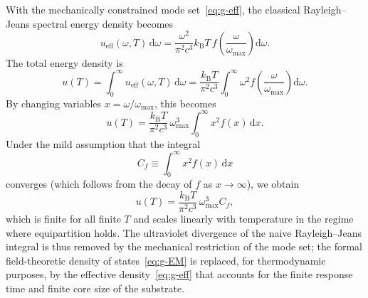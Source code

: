 \documentclass[11pt]{article}
\begin{document}
            With the mechanically constrained mode set~\eqref{eq:g-eff}, the classical
            Rayleigh--Jeans spectral energy density becomes
            \begin{equation}
                u_{\mathrm{eff}}(\omega,T)\,\mathrm{d}\omega
                = \frac{\omega^2}{\pi^2 c^3} k_{\mathrm B}T\,
                f\!\left(\frac{\omega}{\omega_{\max}}\right)\mathrm{d}\omega.
                \label{eq:u-eff}
            \end{equation}
            The total energy density is
            \begin{equation}
                u(T)
                = \int_0^\infty u_{\mathrm{eff}}(\omega,T)\,\mathrm{d}\omega
                = \frac{k_{\mathrm B}T}{\pi^2 c^3}
                \int_0^\infty \omega^2
                f\!\left(\frac{\omega}{\omega_{\max}}\right)\mathrm{d}\omega.
                \label{eq:u-T-integral}
            \end{equation}
            By changing variables $x = \omega/\omega_{\max}$, this becomes
            \begin{equation}
                u(T)
                = \frac{k_{\mathrm B}T}{\pi^2 c^3}\,\omega_{\max}^3
                \int_0^\infty x^2 f(x)\,\mathrm{d}x.
            \end{equation}
            Under the mild assumption that the integral
            \begin{equation}
                C_f \equiv \int_0^\infty x^2 f(x)\,\mathrm{d}x
            \end{equation}
            converges (which follows from the decay of $f$ as $x\to\infty$), we obtain
            \begin{equation}
                u(T)
                = \frac{k_{\mathrm B}T}{\pi^2 c^3}\,\omega_{\max}^3 C_f,
                \label{eq:u-T-finite}
            \end{equation}
            which is finite for all finite $T$ and scales linearly with temperature in the
            regime where equipartition holds. The ultraviolet divergence of the naive
            Rayleigh--Jeans integral is thus removed by the mechanical restriction of the
            mode set; the formal field-theoretic density of states~\eqref{eq:g-EM} is
            replaced, for thermodynamic purposes, by the effective density~\eqref{eq:g-eff}
            that accounts for the finite response time and finite core size of the substrate.
\end{document}
